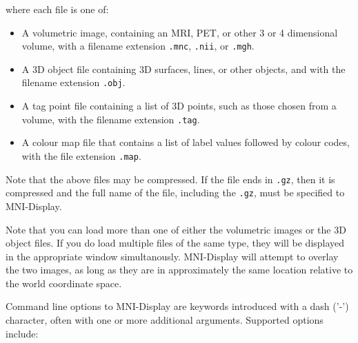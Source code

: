 \documentclass[11pt,letterpaper]{article}
\newcommand{\ident}[1]{{\tt #1}}
\newcommand{\display}{\mbox{MNI-Display}}
\begin{document}
where each file is one of:

\vspace{.5cm}

\begin{itemize}
\item A volumetric image, containing an MRI, PET, or other 3 or 4 dimensional volume, with a filename extension \ident{.mnc}, \ident{.nii}, or \ident{.mgh}.

\item A 3D object file containing 3D surfaces, lines, or other objects, and
with the filename extension \ident{.obj}.

\item A tag point file containing a list of 3D points, such as those chosen from a volume, with the filename extension \ident{.tag}.

\item A colour map file that contains a list of label values followed by colour 
codes, with the file extension \ident{.map}.
\end{itemize}

Note that the above files may be compressed.  If the file ends in
\ident{.gz}, then it is compressed and the full name of the file, including the
\ident{.gz}, must be specified to \display{}.

Note that you can load more than one of either the volumetric images or
the 3D object files. If you do load multiple files of the same type,
they will be displayed in the appropriate window
simultanously. \display{} will attempt to overlay the two images, as
long as they are in approximately the same location relative to the
world coordinate space.

Command line options to \display{} are keywords introduced with a dash
('-') character, often with one or more additional arguments. Supported
options include:
\end{document}
